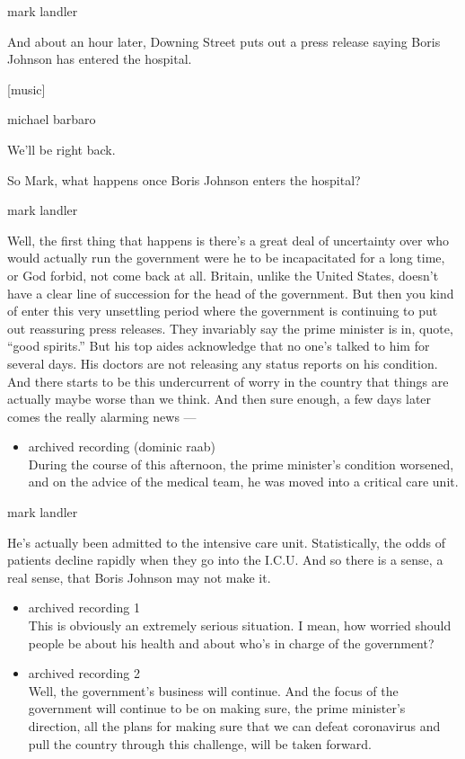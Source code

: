 mark landler

And about an hour later, Downing Street puts out a press release saying
Boris Johnson has entered the hospital.

{[}music{]}

michael barbaro

We'll be right back.

So Mark, what happens once Boris Johnson enters the hospital?

mark landler

Well, the first thing that happens is there's a great deal of
uncertainty over who would actually run the government were he to be
incapacitated for a long time, or God forbid, not come back at all.
Britain, unlike the United States, doesn't have a clear line of
succession for the head of the government. But then you kind of enter
this very unsettling period where the government is continuing to put
out reassuring press releases. They invariably say the prime minister is
in, quote, ``good spirits.'' But his top aides acknowledge that no one's
talked to him for several days. His doctors are not releasing any status
reports on his condition. And there starts to be this undercurrent of
worry in the country that things are actually maybe worse than we think.
And then sure enough, a few days later comes the really alarming news
---

\begin{itemize}
\tightlist
\item
  archived recording (dominic raab)\\
  During the course of this afternoon, the prime minister's condition
  worsened, and on the advice of the medical team, he was moved into a
  critical care unit.
\end{itemize}

mark landler

He's actually been admitted to the intensive care unit. Statistically,
the odds of patients decline rapidly when they go into the I.C.U. And so
there is a sense, a real sense, that Boris Johnson may not make it.

\begin{itemize}
\item
  archived recording 1\\
  This is obviously an extremely serious situation. I mean, how worried
  should people be about his health and about who's in charge of the
  government?
\item
  archived recording 2\\
  Well, the government's business will continue. And the focus of the
  government will continue to be on making sure, the prime minister's
  direction, all the plans for making sure that we can defeat
  coronavirus and pull the country through this challenge, will be taken
  forward.
\end{itemize}

